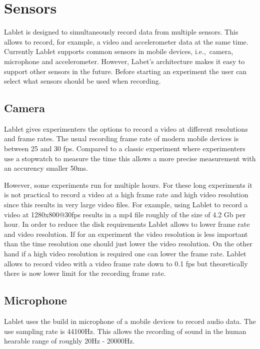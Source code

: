 \documentclass{sigchi}
\newcommand{\ie}{i.e.,\ }
\begin{document}
\cite{Kearney2012}
\cite{Etkina2006}
\cite{Millar2002}
\cite{Trumper2003}

\section{Sensors}
Lablet is designed to simultaneously record data from multiple sensors.
This allows to record, for example, a video and accelerometer data at the same time.
Currently Lablet supports common sensors in mobile devices, \ie camera, microphone and accelerometer.
However, Labet's architecture makes it easy to support other sensors in the future.
Before starting an experiment the user can select what sensors should be used when recording.

\subsection{Camera}
Lablet gives experimenters the options to record a video at different resolutions and frame rates.
The usual recording frame rate of modern mobile devices is between 25 and 30 fps.
Compared to a classic experiment where experimenters use a stopwatch to measure the time this allows a more precise measurement with an accurency smaller 50ms.

However, some experiments run for multiple hours.
For these long experiments it is not practical to record a video at a high frame rate and high video resolution since this results in very large video files.
For example, using Lablet to record a video at 1280x800@30fps results in a mp4 file roughly of the size of 4.2 Gb per hour.
In order to reduce the disk requirements Lablet allows to lower frame rate and video resolution.
If for an experiment the video resolution is less important than the time resolution one should just lower the video resolution.
On the other hand if a high video resolution is required one can lower the frame rate.
Lablet allows to record video with a video frame rate down to 0.1 fps but theoretically there is now lower limit for the recording frame rate.

\subsection{Microphone}
Lablet uses the build in microphone of a mobile devices to record audio data.
The use sampling rate is 44100Hz.
This allows the recording of sound in the human hearable range of roughly 20Hz - 20000Hz.
\end{document}
